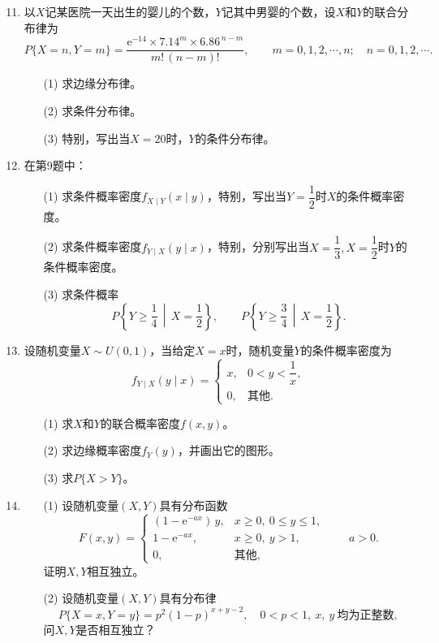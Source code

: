 \documentclass[UTF8]{ctexart}
\begin{document}
\begin{enumerate}
\setcounter{enumi}{10}
\item 以$X$记某医院一天出生的婴儿的个数，$Y$记其中男婴的个数，设$X$和$Y$的联合分布律为
\[
P\{X=n,Y=m\}=\frac{\mathrm{e}^{-14}\times 7.14^{m}\times 6.86^{\,n-m}}{m!\,(n-m)!},
\qquad m=0,1,2,\cdots,n;\quad n=0,1,2,\cdots.
\]
\begin{enumerate}
\item[(1)] 求边缘分布律。
\item[(2)] 求条件分布律。
\item[(3)] 特别，写出当$X=20$时，$Y$的条件分布律。
\end{enumerate}

\setcounter{enumi}{12}
\item 在第9题中：
\begin{enumerate}
\item[(1)] 求条件概率密度$f_{X\mid Y}(x\mid y)$，特别，写出当$Y=\dfrac{1}{2}$时$X$的条件概率密度。
\item[(2)] 求条件概率密度$f_{Y\mid X}(y\mid x)$，特别，分别写出当$X=\dfrac{1}{3},X=\dfrac{1}{2}$时$Y$的条件概率密度。
\item[(3)] 求条件概率
\[
P\left\{Y\ge\frac{1}{4}\,\middle|\,X=\frac{1}{2}\right\},\qquad
P\left\{Y\ge\frac{3}{4}\,\middle|\,X=\frac{1}{2}\right\}.
\]
\end{enumerate}

\setcounter{enumi}{14}
\item 设随机变量$X\sim U(0,1)$，当给定$X=x$时，随机变量$Y$的条件概率密度为
\[
f_{Y\mid X}(y\mid x)=
\begin{cases}
x, & 0<y<\dfrac{1}{x},\\[6pt]
0, & \text{其他}.
\end{cases}
\]
\begin{enumerate}
\item[(1)] 求$X$和$Y$的联合概率密度$f(x,y)$。
\item[(2)] 求边缘概率密度$f_{Y}(y)$，并画出它的图形。
\item[(3)] 求$P\{X>Y\}$。
\end{enumerate}

\setcounter{enumi}{16}
\item 
\begin{enumerate}
\item[(1)] 设随机变量$(X,Y)$具有分布函数
\[
F(x,y)=
\begin{cases}
(1-\mathrm{e}^{-ax})\,y, & x\ge 0,\ 0\le y\le 1,\\[4pt]
1-\mathrm{e}^{-ax}, & x\ge 0,\ y>1,\\[4pt]
0, & \text{其他},
\end{cases}
\qquad a>0.
\]
证明$X,Y$相互独立。
\item[(2)] 设随机变量$(X,Y)$具有分布律
\[
P\{X=x,Y=y\}=p^{2}(1-p)^{x+y-2},\quad 0<p<1,\ x,\ y\ \text{均为正整数},
\]
问$X,Y$是否相互独立？
\end{enumerate}


\end{enumerate}
\end{document}
